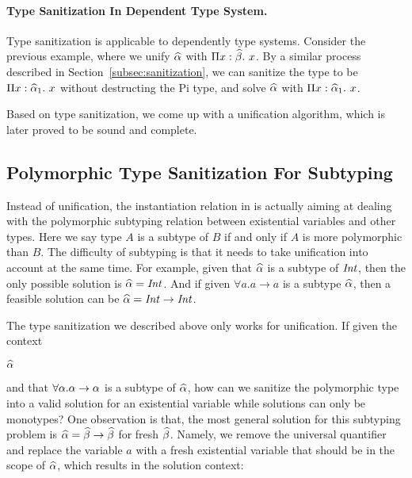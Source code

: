 \paragraph{Type Sanitization In Dependent Type System.}
Type sanitization is applicable to dependently type systems. Consider the previous
example, where we unify $\widehat{\alpha}$ with $\Pi x:\widehat{\beta}.~ x$. By a similar process
described in Section~\ref{subsec:sanitization}, we can sanitize the type to be
$\Pi x:\widehat{\alpha}_1.~ x$ without destructing the Pi type, and solve $\widehat{\alpha}$ with
$\Pi x:\widehat{\alpha}_1.~ x$.




Based on type sanitization, we come up with a unification algorithm, which is
later proved to be sound and complete.

\subsection{Polymorphic Type Sanitization For Subtyping}

Instead of unification, the instantiation relation in
\citet{dunfield2013complete} is actually aiming at dealing with the polymorphic
subtyping relation between existential variables and other types. Here we say
type $A$ is a subtype of $B$ if and only if $A$ is more polymorphic than $B$.
The difficulty of subtyping is that it needs to take unification
into account at the same time. For example, given that $\widehat{\alpha}$ is a subtype of
$\mathit{Int}$, then the only possible solution is $\widehat{\alpha} = \mathit{Int}$. And if given $\forall
a. a \to a$ is a subtype $\widehat{\alpha}$, then a feasible solution can be $\widehat{\alpha} = \mathit{Int}
\to \mathit{Int}$.

The type sanitization we described above only works for unification. If given
the context

$\widehat{\alpha}$

\noindent and that $\forall \alpha. \alpha \to \alpha$ is a subtype of $\widehat{\alpha}$, how
can we sanitize the polymorphic type into a valid solution for an existential
variable while solutions can only be monotypes? One observation is that, the most
general solution for this subtyping problem is $\widehat{\alpha} = \widehat{\beta} \to \widehat{\beta}$ for
fresh $\widehat{\beta}$. Namely, we remove the universal quantifier and replace the
variable $a$ with a fresh existential variable that should be in the scope of
$\widehat{\alpha}$, which results in the solution context:

